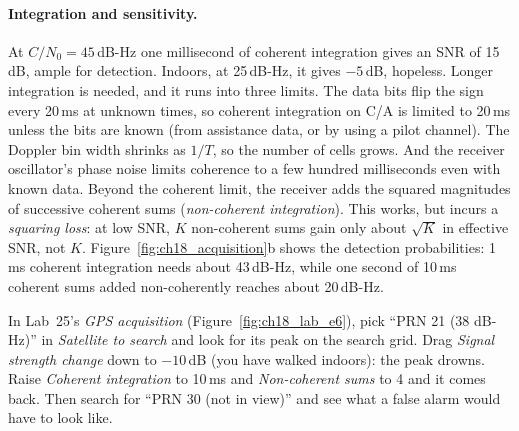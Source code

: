 
\paragraph{Integration and sensitivity.} At $C/N_0=45$\,dB-Hz one millisecond of coherent
integration gives an SNR of 15\,dB, ample for detection. Indoors, at 25\,dB-Hz, it gives
$-5$\,dB, hopeless. Longer integration is needed, and it runs into three limits. The data bits
flip the sign every 20\,ms at unknown times, so coherent integration on C/A is limited to
20\,ms unless the bits are known (from assistance data, or by using a pilot channel). The
Doppler bin width shrinks as $1/T$, so the number of cells grows. And the receiver
oscillator's phase noise limits coherence to a few hundred milliseconds even with known
data. Beyond the coherent limit, the receiver adds the squared magnitudes of successive
coherent sums (\emph{non-coherent integration}). This works, but incurs a \emph{squaring
loss}: at low SNR, $K$ non-coherent sums gain only about $\sqrt K$ in effective SNR, not $K$.
Figure~\ref{fig:ch18_acquisition}b shows the detection probabilities: 1\,ms coherent
integration needs about 43\,dB-Hz, while one second of 10\,ms coherent sums added
non-coherently reaches about 20\,dB-Hz.

\begin{tryit}
In Lab~25's \emph{GPS acquisition} (Figure~\ref{fig:ch18_lab_e6}), pick ``PRN 21 (38 dB-Hz)'' in \emph{Satellite to search} and
look for its peak on the search grid. Drag \emph{Signal strength change} down to $-10$\,dB (you
have walked indoors): the peak drowns. Raise \emph{Coherent integration} to 10\,ms and
\emph{Non-coherent sums} to 4 and it comes back. Then search for ``PRN 30 (not in view)'' and see
what a false alarm would have to look like.
\end{tryit}

